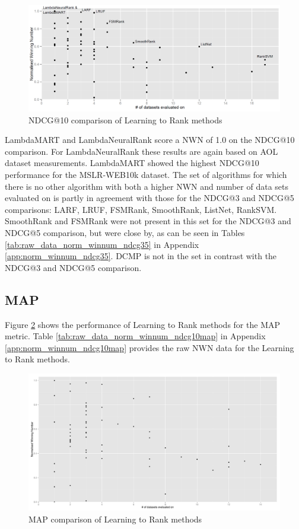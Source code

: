 \begin{figure}[!h]
\includegraphics[scale=0.285]{gfx/ndcg10_winnum}
\caption{\acs{NDCG}@10 comparison of Learning to Rank methods}
\label{fig:normalised_winning_number_NDCG10}
\end{figure}

LambdaMART and LambdaNeuralRank score a \ac{NWN} of 1.0 on the \ac{NDCG}@10 comparison. For LambdaNeuralRank these results are again based on AOL dataset measurements. LambdaMART showed the highest \ac{NDCG}@10 performance for the MSLR-WEB10k dataset. The set of algorithms for which there is no other algorithm with both a higher \ac{NWN} and number of data sets evaluated on is partly in agreement with those for the \ac{NDCG}@3 and \ac{NDCG}@5 comparisons: {LARF, LRUF, FSMRank, SmoothRank, ListNet, RankSVM}. SmoothRank and FSMRank were not present in this set for the \ac{NDCG}@3 and \ac{NDCG}@5 comparison, but were close by, as can be seen in Tables \ref{tab:raw_data_norm_winnum_ndcg35} in Appendix \ref{app:norm_winnum_ndcg35}. DCMP is not in the set in contrast with the \ac{NDCG}@3 and \ac{NDCG}@5 comparison.

\subsection{MAP}
Figure \ref{fig:normalised_winning_number_map} shows the performance of Learning to Rank methods for the \ac{MAP} metric. Table \ref{tab:raw_data_norm_winnum_ndcg10map} in Appendix \ref{app:norm_winnum_ndcg10map} provides the raw \ac{NWN} data for the Learning to Rank methods.\\

\begin{figure}[!h]
\includegraphics[scale=0.285]{gfx/map_winnum}
\caption{\acs{MAP} comparison of Learning to Rank methods}
\label{fig:normalised_winning_number_map}
\end{figure}

